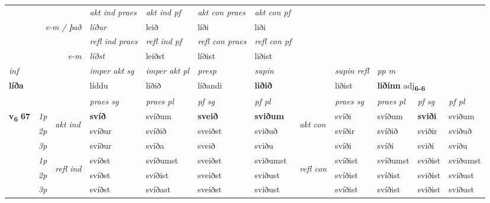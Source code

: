 \begin{longtable}[l]{X>{\footnotesize\itshape}llXXXXlXXXX}
   && &  \textit{akt ind praes} & \textit{akt ind pf} & \textit{akt con praes} & \textit{akt con pf} \\*
\multicolumn{3}{r}{\textit{e-m / það}} & líður & leið & líði & liði \\*

\cmidrule{4-7}
 & && \textit{refl ind praes} & \textit{refl ind pf} & \textit{refl con praes} & \textit{refl con pf} \\*
\multicolumn{3}{r}{\textit{e-m}}& líðst & leiðst & líðist & liðist \\*

\cmidrule{4-7}
   {\textit{inf}} & &  & \textit{imper akt sg} & \textit{imper akt pl}   & \textit{presp} & \textit{supin} && \textit{supin refl} & \textit{pp m} \\*
  {\textbf{líða}} & && líddu  & líðið   & líðandi &  \textbf{liðið} && liðist & \multicolumn{2}{l}{\textbf{liðinn} adj\textbf{\textsubscript{6-6}}} \\*

\midrule

 & &   & \textit{praes sg}  & \textit{praes pl}    & \textit{ pf sg} & \textit{pf pl} & & \textit{praes sg}  & \textit{praes pl}    & \textit{pf sg} & \textit{pf pl }  \\ \cmidrule{4-7} \cmidrule{9-12}
 \multirow{2}{*}{{{\textbf{v{\textsubscript{6}}} \Large{\textbf{67}}}}}  & 1p & \multirow{3}{*}{\begin{turn}{90}\textit{akt ind}\end{turn}} & \textbf{svíð} & svíðum & \textbf{sveið} & \textbf{sviðum} & \multirow{3}{*}{\begin{turn}{90}\textit{akt con}\end{turn}} &svíði & svíðum & \textbf{sviði} & sviðum\\*
 & 2p &  &  svíður  & svíðið & sveiðst & sviðuð & & svíðir & svíðið & sviðir & sviðuð \\*
 & 3p &  & svíður & svíða & sveið & sviðu & & svíði & svíði& sviði & sviðu \\*
\cmidrule{4-7} \cmidrule{9-12}
 & 1p & \multirow{3}{*}{\begin{turn}{90}\textit{refl ind}\end{turn}}  & svíðst & svíðumst & sveiðst & sviðumst & \multirow{3}{*}{\begin{turn}{90}\textit{refl con}\end{turn}}  &svíðist & svíðumst & sviðist & sviðumst \\*
 & 2p &  & svíðst & svíðist & sveiðst & sviðust & &svíðist & svíðist & sviðist & sviðust \\*
 & 3p  & & svíðst & svíðast & sveiðst & sviðust & & svíðist & svíðist& sviðist & sviðust \\*
\cmidrule{4-7} \cmidrule{9-12}


\end{longtable}
